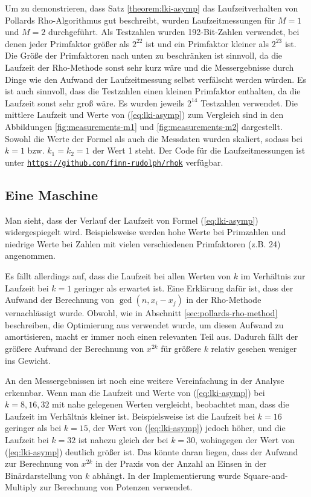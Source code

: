 \documentclass[a4paper, 11pt, ngerman]{article}
\theoremstyle{definition}
\theoremstyle{plain}
\theoremstyle{remark}
\begin{document}
Um zu demonstrieren, dass Satz \ref{theorem:lki-asymp} das Laufzeitverhalten von Pollards Rho-Algorithmus gut beschreibt, wurden Laufzeitmessungen für $M = 1$ und $M = 2$ durchgeführt. Als Testzahlen wurden 192-Bit-Zahlen verwendet, bei denen jeder Primfaktor größer als $2^{22}$ ist und ein Primfaktor kleiner als $2^{23}$ ist. Die Größe der Primfaktoren nach unten zu beschränken ist sinnvoll, da die Laufzeit der Rho-Methode sonst sehr kurz wäre und die Messergebnisse durch Dinge wie den Aufwand der Laufzeitmessung selbst verfälscht werden würden. Es ist auch sinnvoll, dass die Testzahlen einen kleinen Primfaktor enthalten, da die Laufzeit sonst sehr groß wäre. Es wurden jeweils $2^{14}$ Testzahlen verwendet. Die mittlere Laufzeit und Werte von (\ref{eq:lki-asymp}) zum Vergleich sind in den Abbildungen \ref{fig:measurements-m1} und \ref{fig:measurements-m2} dargestellt. Sowohl die Werte der Formel als auch die Messdaten wurden skaliert, sodass bei $k = 1$ bzw. $k_1 = k_2 = 1$ der Wert 1 steht. Der Code für die Laufzeitmessungen ist unter \href{https://github.com/finn-rudolph/rhok}{\texttt{https://github.com/finn-rudolph/rhok}} verfügbar.

\subsection{Eine Maschine}

Man sieht, dass der Verlauf der Laufzeit von Formel (\ref{eq:lki-asymp}) widergespiegelt wird. Beispielsweise werden hohe Werte bei Primzahlen und niedrige Werte bei Zahlen mit vielen verschiedenen Primfaktoren (z.B. 24) angenommen.

Es fällt allerdings auf, dass die Laufzeit bei allen Werten von $k$ im Verhältnis zur Laufzeit bei $k = 1$ geringer als erwartet ist. Eine Erklärung dafür ist, dass der Aufwand der Berechnung von $\gcd(n, x_i - x_j)$ in der Rho-Methode vernachlässigt wurde. Obwohl, wie in Abschnitt \ref{sec:pollards-rho-method} beschreiben, die Optimierung aus \cite{bre80} verwendet wurde, um diesen Aufwand zu amortisieren, macht er immer noch einen relevanten Teil aus. Dadurch fällt der größere Aufwand der Berechnung von $x^{2k}$ für größere $k$ relativ gesehen weniger ins Gewicht.

An den Messergebnissen ist noch eine weitere Vereinfachung in der Analyse erkennbar. Wenn man die Laufzeit und Werte von (\ref{eq:lki-asymp}) bei $k = 8, 16, 32$ mit nahe gelegenen Werten vergleicht, beobachtet man, dass die Laufzeit im Verhältnis kleiner ist. Beispielsweise ist die Laufzeit bei $k = 16$ geringer als bei $k = 15$, der Wert von (\ref{eq:lki-asymp}) jedoch höher, und die Laufzeit bei $k = 32$ ist nahezu gleich der bei $k = 30$, wohingegen der Wert von (\ref{eq:lki-asymp}) deutlich größer ist. Das könnte daran liegen, dass der Aufwand zur Berechnung von $x^{2k}$ in der Praxis von der Anzahl an Einsen in der Binärdarstellung von $k$ abhängt. In der Implementierung wurde Square-and-Multiply zur Berechnung von Potenzen verwendet.
\end{document}
